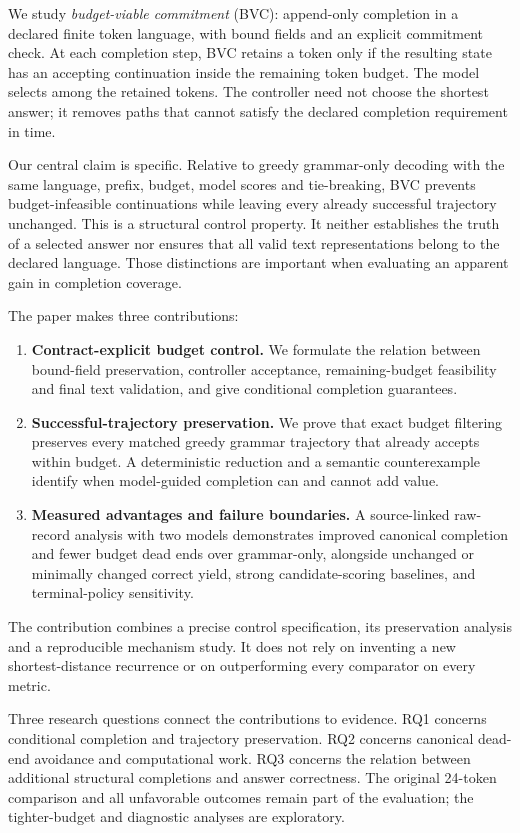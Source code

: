 \documentclass[12pt,a4paper]{article}
\begin{document}
We study \emph{budget-viable commitment} (BVC): append-only completion in a declared finite token language, with bound fields and an explicit commitment check. At each completion step, BVC retains a token only if the resulting state has an accepting continuation inside the remaining token budget. The model selects among the retained tokens. The controller need not choose the shortest answer; it removes paths that cannot satisfy the declared completion requirement in time.

Our central claim is specific. Relative to greedy grammar-only decoding with the same language, prefix, budget, model scores and tie-breaking, BVC prevents budget-infeasible continuations while leaving every already successful trajectory unchanged. This is a structural control property. It neither establishes the truth of a selected answer nor ensures that all valid text representations belong to the declared language. Those distinctions are important when evaluating an apparent gain in completion coverage.

The paper makes three contributions:
\begin{enumerate}
\item \textbf{Contract-explicit budget control.} We formulate the relation between bound-field preservation, controller acceptance, remaining-budget feasibility and final text validation, and give conditional completion guarantees.
\item \textbf{Successful-trajectory preservation.} We prove that exact budget filtering preserves every matched greedy grammar trajectory that already accepts within budget. A deterministic reduction and a semantic counterexample identify when model-guided completion can and cannot add value.
\item \textbf{Measured advantages and failure boundaries.} A source-linked raw-record analysis with two models demonstrates improved canonical completion and fewer budget dead ends over grammar-only, alongside unchanged or minimally changed correct yield, strong candidate-scoring baselines, and terminal-policy sensitivity.
\end{enumerate}
The contribution combines a precise control specification, its preservation analysis and a reproducible mechanism study. It does not rely on inventing a new shortest-distance recurrence or on outperforming every comparator on every metric.

Three research questions connect the contributions to evidence. RQ1 concerns conditional completion and trajectory preservation. RQ2 concerns canonical dead-end avoidance and computational work. RQ3 concerns the relation between additional structural completions and answer correctness. The original 24-token comparison and all unfavorable outcomes remain part of the evaluation; the tighter-budget and diagnostic analyses are exploratory.
\end{document}
